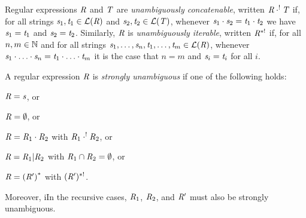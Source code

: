 \documentclass[numbers,10pt,preprint\ifanon ,nocopyrightspace\fi]{sigplanconf}
\begin{document}
Regular expressions $\mathit{R}$ and $\mathit{T}$ are 
\textit{unambiguously concatenable}, written
$\mathit{R}\cdot^!\mathit{T}$ if, 
for all strings $\mathit{s}_1,\mathit{t}_1\in\mathcal{L}(\mathit{R})$ and
$\mathit{s}_2,\mathit{t}_2\in\mathcal{L}(\mathit{T})$, whenever
$\mathit{s}_1\cdot\mathit{s}_2=\mathit{t}_1\cdot\mathit{t}_2$ we have
$\mathit{s}_1=\mathit{t}_1$ and $\mathit{s}_2=\mathit{t}_2$.
%
Similarly, $\mathit{R}$ is \textit{unambiguously iterable},
written $\mathit{R}^{*!}$ if,
for all $n,m\in\mathbb{N}$ and for all strings
$\mathit{s}_1,\ldots,\mathit{s}_n,\mathit{t}_1,\ldots,\mathit{t}_m\in\mathcal{L}(\mathit{R})$,
whenever
$\mathit{s}_1\cdot\ldots\cdot\mathit{s}_n=\mathit{t}_1\cdot\ldots\cdot\mathit{t}_m$
it is the case that $n=m$ and $\mathit{s}_i=\mathit{t}_i$ for all $i$.

A regular expression $\mathit{R}$ is \textit{strongly unambiguous} if one
of the following holds: 
\begin{enumerate*}[label=(\alph*) ]
\item $\mathit{R} = \mathit{s}$,  or
\item $\mathit{R} = \emptyset$, or 
\item $\mathit{R} = \mathit{R}_1 \cdot \mathit{R}_2$ with $\mathit{R}_1 \cdot^!
  \mathit{R}_2$, or
\item $\mathit{R} = \mathit{R}_1 | \mathit{R}_2$ with $\mathit{R}_1 \cap \mathit{R}_2 =
  \emptyset$, 
or
\item $\mathit{R} = {(\mathit{R}')}^*$ with $(\mathit{R}')^{*!}$.
\end{enumerate*}
\iffull Moreover, i\else I\fi{}n the recursive cases, $\mathit{R}_1$, $\mathit{R}_2$, and $\mathit{R}'$
must also be strongly unambiguous.


\end{document}
